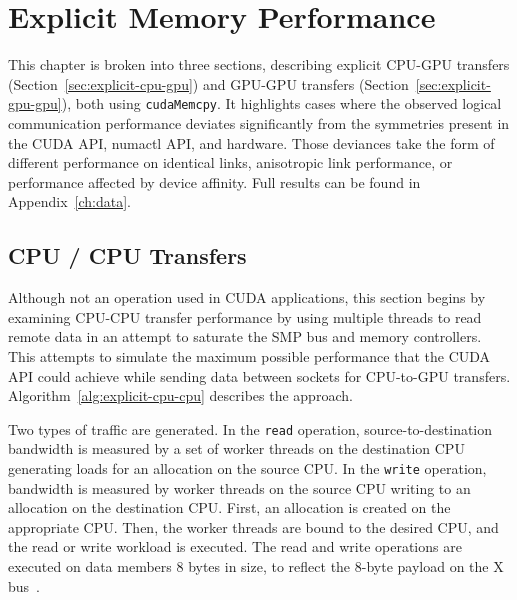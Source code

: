 \chapter{Explicit Memory Performance}
\label{ch:explicit}

This chapter is broken into three sections, describing explicit CPU-GPU transfers (Section~\ref{sec:explicit-cpu-gpu}) and GPU-GPU transfers (Section~\ref{sec:explicit-gpu-gpu}), both using \texttt{cudaMemcpy}.
It highlights cases where the observed logical communication performance deviates significantly from the symmetries present in the CUDA API, numactl API, and hardware.
Those deviances take the form of different performance on identical links, anisotropic link performance, or performance affected by device affinity.
Full results can be found in Appendix~\ref{ch:data}.

\section{CPU / CPU Transfers}
\label{sec:explicit-cpu-cpu}

Although not an operation used in CUDA applications, this section begins by examining CPU-CPU transfer performance by using multiple threads to read remote data in an attempt to saturate the SMP bus and memory controllers.
This attempts to simulate the maximum possible performance that the CUDA API could achieve while sending data between sockets for CPU-to-GPU transfers.
Algorithm~\ref{alg:explicit-cpu-cpu} describes the approach.

Two types of traffic are generated.
In the \texttt{read} operation, source-to-destination bandwidth is measured by a set of worker threads on the destination CPU generating loads for an allocation on the source CPU.
In the \texttt{write} operation, bandwidth is measured by worker threads on the source CPU writing to an allocation on the destination CPU.
First, an allocation is created on the appropriate CPU.
Then, the worker threads are bound to the desired CPU, and the read or write workload is executed.
The read and write operations are executed on data members 8 bytes in size, to reflect the 8-byte payload on the X bus~\cite{caldeira2016s822lc}.

